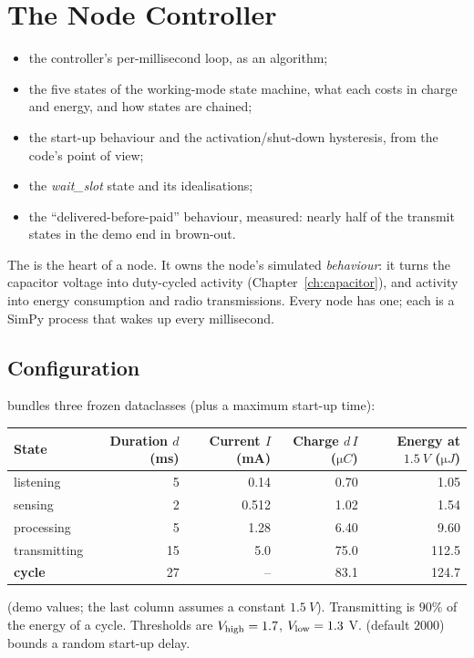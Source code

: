 \chapter{The Node Controller}
\label{ch:controller}

\begin{defbox}
\begin{itemize}
 \item the controller's per-millisecond loop, as an algorithm;
 \item the five states of the working-mode state machine, what each costs in charge and energy, and how states are chained;
 \item the start-up behaviour and the activation/shut-down hysteresis, from the code's point of view;
 \item the \emph{wait\_slot} state and its idealisations;
 \item the ``delivered-before-paid'' behaviour, measured: nearly half of the transmit states in the demo end in brown-out.
\end{itemize}
\end{defbox}

The  is the heart of a node. It owns the node's simulated \emph{behaviour}: it turns the capacitor voltage into duty-cycled activity (Chapter~\ref{ch:capacitor}), and activity into energy consumption and radio transmissions. Every node has one; each is a SimPy process that wakes up every millisecond.

\section{Configuration}

 bundles three frozen dataclasses (plus a maximum start-up time):
\begin{center}
\small
\renewcommand{\arraystretch}{1.12}
\begin{tabular}{@{}lrrrr@{}}
\toprule
State & Duration $d$ (ms) & Current $I$ (mA) & Charge $d\,I$ ($\si{\micro C}$) & Energy at $\SI{1.5}{V}$ ($\si{\micro J}$)\\
\midrule
listening & 5 & 0.14 & 0.70 & 1.05\\
sensing & 2 & 0.512 & 1.02 & 1.54\\
processing & 5 & 1.28 & 6.40 & 9.60\\
transmitting & 15 & 5.0 & 75.0 & 112.5\\
\midrule
\textbf{cycle} & 27 & -- & 83.1 & 124.7\\
\bottomrule
\end{tabular}
\end{center}
(demo values; the last column assumes a constant $\SI{1.5}{V}$). Transmitting is $90\%$ of the energy of a cycle. Thresholds are $V_{\mathrm{high}}=1.7$, $V_{\mathrm{low}}=1.3$ \si{V}.  (default $2000$) bounds a random start-up delay.

